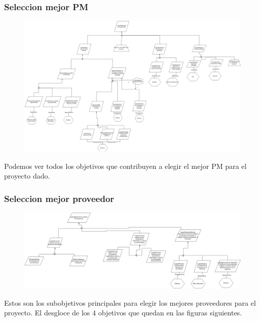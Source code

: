\subsubsection{Seleccion mejor PM}

\begin{figure}[H]
    \centering
    \includegraphics[width=9.5in, keepaspectratio, angle=90]{imagenes/objetivos-seleccion-mejor-pm.png}
\end{figure}

Podemos ver todos los objetivos que contribuyen a elegir el mejor PM para el proyecto dado.

\subsubsection{Seleccion mejor proveedor}

\begin{figure}[H]
    \centering
    \includegraphics[width=9in, keepaspectratio, angle=90]{imagenes/objetivos-seleccion-mejor-proveedor-principal.png}
\end{figure}

Estos son los subobjetivos principales para elegir los mejores proveedores para el proyecto. El desgloce de los 4 objetivos que quedan en las figuras siguientes.

